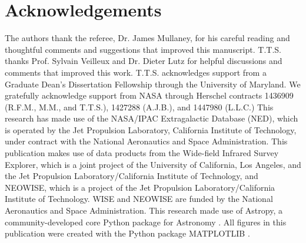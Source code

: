 \documentclass[fleqn, usenatbib]{mnras}
\begin{document}
\section*{Acknowledgements}
The authors thank the referee, Dr. James Mullaney, for his careful reading and thoughtful comments and suggestions that improved this manuscript. T.T.S. thanks Prof. Sylvain Veilleux and Dr. Dieter Lutz for helpful discussions and comments that improved this work. T.T.S. acknowledges support from a Graduate Dean's Dissertation Fellowship through the University of Maryland. We gratefully acknowledge support from NASA through Herschel contracts 1436909 (R.F.M., M.M., and T.T.S.), 1427288 (A.J.B.), and 1447980 (L.L.C.) This research has made use of the NASA/IPAC Extragalactic Database (NED), which is operated by the Jet Propulsion Laboratory, California Institute of Technology, under contract with the National Aeronautics and Space Administration. This publication makes use of data products from the Wide-field Infrared Survey Explorer, which is a joint project of the University of California, Los Angeles, and the Jet Propulsion Laboratory/California Institute of Technology, and NEOWISE, which is a project of the Jet Propulsion Laboratory/California Institute of Technology. WISE and NEOWISE are funded by the National Aeronautics and Space Administration. This research made use of Astropy, a community-developed core Python package for Astronomy \citep{Astropy:2013ek}. All figures in this publication were created with the Python package \textsc{MATPLOTLIB} \citep{Hunter:2007}. 






\appendix
\end{document}
